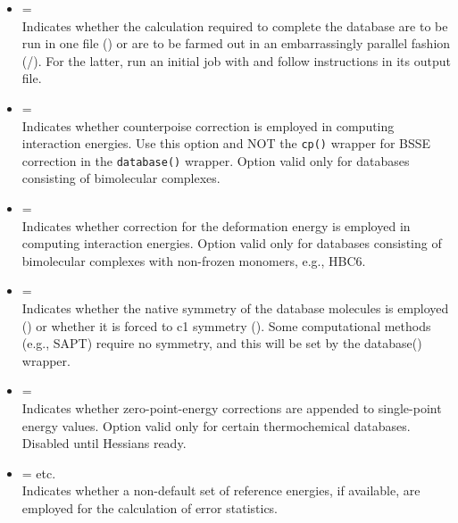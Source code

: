 \begin{itemize}
\item {} = \textit{} \textbar\;  \textbar\;  \\
Indicates whether the calculation required to complete the database are to be run in one
file () or are to be farmed out in an embarrassingly 
parallel fashion (/).
For the latter, run an initial job with  and follow instructions in its output file.

\item {} =  \textbar\; \textit{} \\
Indicates whether counterpoise correction is employed in computing interaction energies.
Use this option and NOT the \texttt{cp()} wrapper for BSSE correction in the \texttt{database()} wrapper.
Option valid only for databases consisting of bimolecular complexes.

\item {} =  \textbar\; \textit{} \\
Indicates whether correction for the deformation energy is employed in computing interaction energies.
Option valid only for databases consisting of bimolecular complexes with non-frozen monomers, e.g., HBC6.

\item {} = \textit{} \textbar\;  \\
Indicates whether the native symmetry of the database molecules is employed () or whether
it is forced to c1 symmetry (). Some computational methods (e.g., SAPT) require no symmetry,
and this will be set by the database() wrapper.

\item {} =  \textbar\; \textit{} \\
Indicates whether zero-point-energy corrections are appended to single-point energy values. Option
valid only for certain thermochemical databases. Disabled until Hessians ready.

\item {} = \textit{} \textbar\; etc. \\
Indicates whether a non-default set of reference energies, if available, are employed for the 
calculation of error statistics.


\end{itemize}
